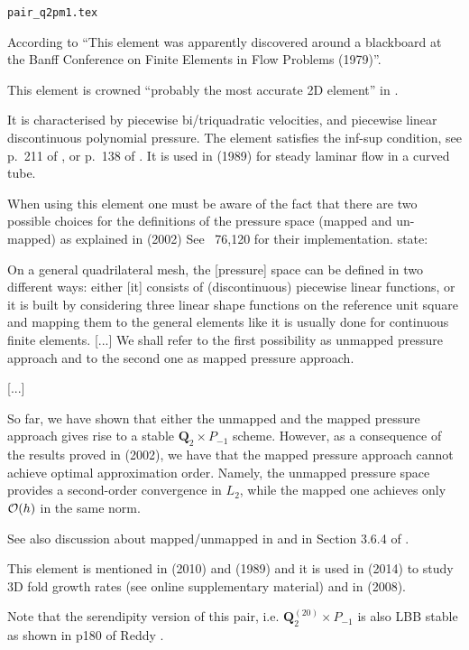 \begin{flushright} {\tiny {\color{gray} \tt pair\_q2pm1.tex}} \end{flushright}

According to \textcite{bobf08} 
{\color{darkgray} ``This element was apparently discovered 
around a blackboard at the Banff Conference on Finite Elements in 
Flow Problems (1979)''}.

\begin{center}

\end{center}

This element is crowned ``probably the most accurate 2D element''
in \textcite{grsa}.

It is characterised by piecewise bi/triquadratic velocities, 
and piecewise linear discontinuous polynomial pressure. 
The element satisfies the inf-sup condition, see p.~211 of \textcite{hugh}, or 
p.~138 of \textcite{elsw}.
It is used in \textcite{vavs89} (1989) for steady laminar flow in a curved tube. 

When using this element one must be aware of the fact that there are 
two possible choices for the definitions of the pressure space 
(mapped and un-mapped) as explained
in \textcite{boga02} (2002) 
See \stone~76,120 for their implementation.
\textcite{bobf08} state: 
\begin{displayquote}
{\color{darkgray}
On a general quadrilateral mesh, the [pressure] space 
can be defined in two different ways: either [it] 
consists of (discontinuous) piecewise linear functions, or it is built
by considering three linear shape functions on the reference unit square and mapping
them to the general elements like it is usually done for continuous 
finite elements. [...] We shall refer to the first possibility as 
unmapped pressure approach and to the second one as mapped pressure approach.

[...] 

So far, we have shown that either the 
unmapped and the mapped pressure 
approach gives rise to a stable ${\bm Q}_2\times P_{-1}$ scheme. 
However, as a consequence of the
results proved in \textcite{arbf02} (2002), we have that the mapped 
pressure approach cannot achieve 
optimal approximation order. Namely, the unmapped pressure space 
provides a second-order convergence 
in $L_2$, while the mapped one achieves only ${\cal O}(h)$ in the same norm.}
\end{displayquote}

See also discussion about mapped/unmapped in \textcite{bobf13} and 
in Section 3.6.4 of \textcite{john16}.

This element is mentioned in \textcite{kaus10} (2010) and \textcite{pefc89} (1989) 
and it is used in \textcite{freh14} (2014) to study 3D fold growth rates 
(see online supplementary material) and in \textcite{schm08} (2008).

Note that the serendipity version of this pair, 
i.e. ${\bm Q}_2^{(20)}\times P_{-1}$ is also LBB stable
as shown in p180 of Reddy \cite{reddybook2}.


